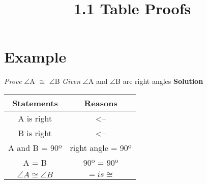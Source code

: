 \documentclass{article}
\begin{document}
	
	\setlength{\droptitle}{-5em}
	\title{1.1 Table Proofs}
	\date{}
	\author{}
	\maketitle
	
	\section{Example}
	\textit{Prove} $\angle$A $\cong$ $\angle$B \newline \newline
	\textit{Given} $\angle$A and $\angle$B are right angles\newline \newline
	\textbf{Solution} \newline
	
	\hskip-0.5cm\begin{tabular}{|c | c|} 
		\hline
		Statements & Reasons \\ [0.5ex] 
		\hline\hline
		\angle A is right & <--  \\ 
		\hline
		\angle B is right & <--  \\
		\hline
		\angle A and \angle B = 90º & right angle = 90º \\
		\hline
		\angle A = \angle B & 90º = 90º  \\
		\hline
		$\angle A \cong \angle B$ & $= is \cong$   \\ [1ex] 
		\hline
	\end{tabular}
	
	
	
\end{document}
